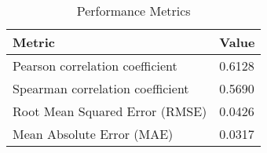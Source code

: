 \documentclass{article}
\begin{document}
\begin{table}[h!]
\centering
\begin{tabular}{ll}
\toprule
Metric & Value \\
\midrule
Pearson correlation coefficient & 0.6128 \\
Spearman correlation coefficient & 0.5690 \\
Root Mean Squared Error (RMSE) & 0.0426 \\
Mean Absolute Error (MAE) & 0.0317 \\
\bottomrule
\end{tabular}
\caption{Performance Metrics}
\label{tab:metrics}
\end{table}
\end{document}
